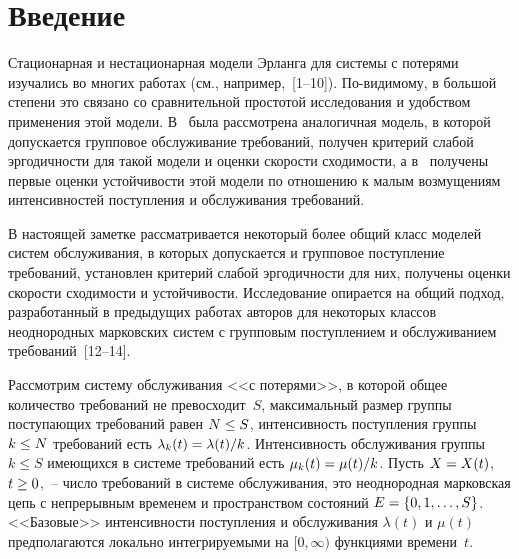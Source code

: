 




\thispagestyle{headings}

\begin{multicols}{2}

\label{st\stat}

\section{Введение}

Стационарная и нестационарная модели Эрланга для системы с потерями
изучались во многих работах (см., например,~[1--10]).
По-видимому, в большой степени это связано со сравнительной
простотой исследования и удобством применения этой модели.
В~\cite{z13a} была рассмотрена аналогичная модель, в которой
допускается групповое обслуживание требований, получен критерий
слабой эргодичности для такой модели и оценки ско\-рости сходимости, а
в~\cite{z14c} получены первые оценки устойчивости этой модели по
отношению к малым возмущениям интенсивностей поступления и
обслуживания требований.

В настоящей заметке рассматривается некоторый более общий класс
моделей систем об\-служивания, в которых допускается и групповое
поступление требований, установлен критерий слабой эргодич\-ности для
них, получены оценки скорости сходимости и устойчивости.
Исследование опирается на общий подход, разработанный в предыдущих
работах авторов для некоторых классов неоднородных марковских систем
с групповым поступлением и обслуживанием требований~[12--14].
{

}


Рассмотрим систему обслуживания <<с потерями>>, в которой общее
количество требований не превосходит~$S$,  максимальный размер
группы поступающих требований равен $N \hm\le S$, интенсивность
поступления группы $k \hm\le N$ требований есть
$\lambda_{k}(t)\hm={\lambda (t)}/{k}$. Интенсивность обслуживания
группы $k \le S$ имеющихся в системе требований есть
$\mu_{k}(t)\hm={\mu (t)}/{k}$. Пусть $X\hm=X(t)$, $t\hm\geq 0$,~-- число
требований в системе обслуживания, это неоднородная марковская цепь
с непрерывным временем и пространством  состояний $E\hm=\{0,1, \ldots,
S \}$. <<Базовые>> интенсивности поступления и обслуживания
$\lambda(t)$ и $\mu(t)$  предполагаются локально интегри\-ру\-емы\-ми на
$[0,\infty)$ функциями времени~$t$.



\end{multicols}
